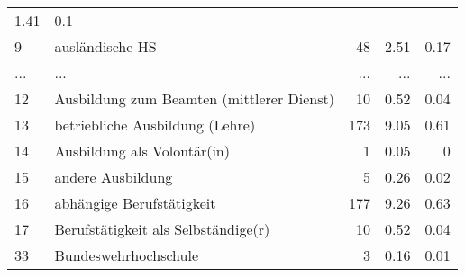 \begin{longtable}{lXrrr}
          \num[round-mode=places,round-precision=2]{1.41} &
          \num[round-mode=places,round-precision=2]{0.1} \\
        9 & \multicolumn{1}{X}{ausländische HS} & %
          \num{48} &
          \num[round-mode=places,round-precision=2]{2.51} &
          \num[round-mode=places,round-precision=2]{0.17} \\
       ... & ... & ... & ... & ... \\
        12 & \multicolumn{1}{X}{Ausbildung zum Beamten (mittlerer Dienst)} & %
          \num{10} &
          \num[round-mode=places,round-precision=2]{0.52} &
          \num[round-mode=places,round-precision=2]{0.04} \\

        13 & \multicolumn{1}{X}{betriebliche Ausbildung (Lehre)} & %
          \num{173} &
          \num[round-mode=places,round-precision=2]{9.05} &
          \num[round-mode=places,round-precision=2]{0.61} \\

        14 & \multicolumn{1}{X}{Ausbildung als Volontär(in)} & %
          \num{1} &
          \num[round-mode=places,round-precision=2]{0.05} &
          \num[round-mode=places,round-precision=2]{0} \\

        15 & \multicolumn{1}{X}{andere Ausbildung} & %
          \num{5} &
          \num[round-mode=places,round-precision=2]{0.26} &
          \num[round-mode=places,round-precision=2]{0.02} \\

        16 & \multicolumn{1}{X}{abhängige Berufstätigkeit} & %
          \num{177} &
          \num[round-mode=places,round-precision=2]{9.26} &
          \num[round-mode=places,round-precision=2]{0.63} \\

        17 & \multicolumn{1}{X}{Berufstätigkeit als Selbständige(r)} & %
          \num{10} &
          \num[round-mode=places,round-precision=2]{0.52} &
          \num[round-mode=places,round-precision=2]{0.04} \\

        33 & \multicolumn{1}{X}{Bundeswehrhochschule} & %
          \num{3} &
          \num[round-mode=places,round-precision=2]{0.16} &
          \num[round-mode=places,round-precision=2]{0.01} \\


\end{longtable}
